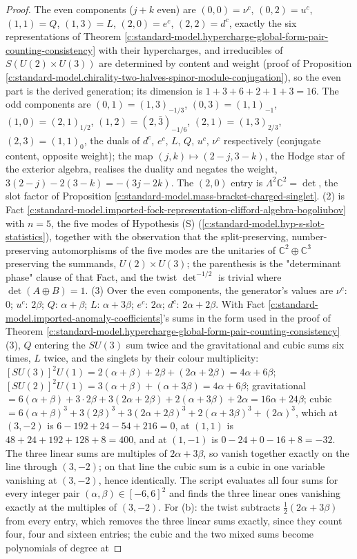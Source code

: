 \documentclass[11pt]{article}
\theoremstyle{definition}
\theoremstyle{plain}
\providecommand{\C}{}\renewcommand{\C}{\mathbb{C}}
\begin{document}
\begin{proof}
The even components ($j + k$ even) are $(0,0) = \nu^{c}$, $(0,2) = u^{c}$, $(1,1) = Q$, $(1,3) = L$, $(2,0) = e^{c}$, $(2,2) = d^{c}$, exactly the six representations of Theorem \ref{c:standard-model.hypercharge-global-form-pair-counting-consistency} with their hypercharges, and irreducibles of $S(U(2) \times U(3))$ are determined by content and weight (proof of Proposition \ref{c:standard-model.chirality-two-halves-spinor-module-conjugation}), so the even part is the derived generation; its dimension is $1 + 3 + 6 + 2 + 1 + 3 = 16$. The odd components are $(0,1) = (1,3)_{-1/3}$, $(0,3) = (1,1)_{-1}$, $(1,0) = (2,1)_{1/2}$, $(1,2) = (2,\bar{3})_{-1/6}$, $(2,1) = (1,3)_{2/3}$, $(2,3) = (1,1)_{0}$, the duals of $d^{c}$, $e^{c}$, $L$, $Q$, $u^{c}$, $\nu^{c}$ respectively (conjugate content, opposite weight); the map $(j, k) \mapsto (2 - j, 3 - k)$, the Hodge star of the exterior algebra, realises the duality and negates the weight, $3(2-j) - 2(3-k) = -(3j - 2k)$. The $(2,0)$ entry is $\Lambda^{2}\C^{2} = \det$, the slot factor of Proposition \ref{c:standard-model.mass-bracket-charged-singlet}. (2) is Fact \ref{c:standard-model.imported-fock-representation-clifford-algebra-bogoliubov} with $n = 5$, the five modes of Hypothesis (S) (\ref{c:standard-model.hyp-s-slot-statistics}), together with the observation that the split-preserving, number-preserving automorphisms of the five modes are the unitaries of $\C^{2} \oplus \C^{3}$ preserving the summands, $U(2) \times U(3)$; the parenthesis is the "determinant phase" clause of that Fact, and the twist $\det^{-1/2}$ is trivial where $\det(A \oplus B) = 1$. (3) Over the even components, the generator's values are $\nu^{c}$: $0$; $u^{c}$: $2\beta$; $Q$: $\alpha + \beta$; $L$: $\alpha + 3\beta$; $e^{c}$: $2\alpha$; $d^{c}$: $2\alpha + 2\beta$. With Fact \ref{c:standard-model.imported-anomaly-coefficients}'s sums in the form used in the proof of Theorem \ref{c:standard-model.hypercharge-global-form-pair-counting-consistency}(3), $Q$ entering the $SU(3)$ sum twice and the gravitational and cubic sums six times, $L$ twice, and the singlets by their colour multiplicity: $[SU(3)]^{2}U(1) = 2(\alpha + \beta) + 2\beta + (2\alpha + 2\beta) = 4\alpha + 6\beta$; $[SU(2)]^{2}U(1) = 3(\alpha + \beta) + (\alpha + 3\beta) = 4\alpha + 6\beta$; gravitational $= 6(\alpha + \beta) + 3 \cdot 2\beta + 3(2\alpha + 2\beta) + 2(\alpha + 3\beta) + 2\alpha = 16\alpha + 24\beta$; cubic $= 6(\alpha + \beta)^{3} + 3(2\beta)^{3} + 3(2\alpha + 2\beta)^{3} + 2(\alpha + 3\beta)^{3} + (2\alpha)^{3}$, which at $(3, -2)$ is $6 - 192 + 24 - 54 + 216 = 0$, at $(1, 1)$ is $48 + 24 + 192 + 128 + 8 = 400$, and at $(1, -1)$ is $0 - 24 + 0 - 16 + 8 = -32$. The three linear sums are multiples of $2\alpha + 3\beta$, so vanish together exactly on the line through $(3,-2)$; on that line the cubic sum is a cubic in one variable vanishing at $(3,-2)$, hence identically. The script evaluates all four sums for every integer pair $(\alpha, \beta) \in [-6, 6]^{2}$ and finds the three linear ones vanishing exactly at the multiples of $(3, -2)$. For (b): the twist subtracts $\tfrac12(2\alpha + 3\beta)$ from every entry, which removes the three linear sums exactly, since they count four, four and sixteen entries; the cubic and the two mixed sums become polynomials of degree at 
\end{proof}
\end{document}
